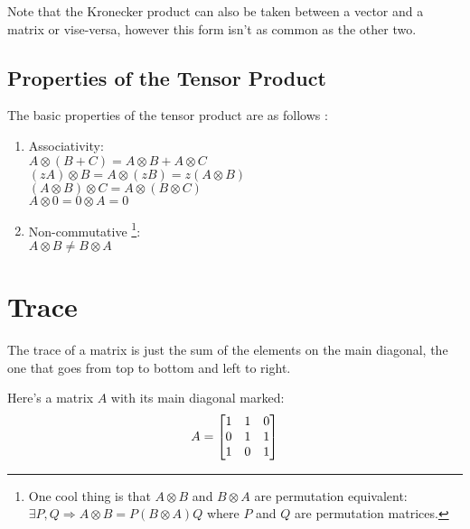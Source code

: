 Note that the Kronecker product can also be taken between a vector and a matrix or vise-versa, however this form isn't as common as the other two.


\subsection{Properties of the Tensor Product}
The basic properties of the tensor product are as follows \cite{QCandQI:tensor_product, wiki:tensor_product}:
\begin{enumerate}
	\item Associativity: \\ $A \otimes (B + C) = A \otimes B + A \otimes C$ \\
	$ (zA) \otimes B = A \otimes (zB) = z(A \otimes B)$\\
	$ (A \otimes B) \otimes C = A \otimes (B\otimes C)$ \\
	$A \otimes 0 = 0 \otimes A = 0 $
	\item Non-commutative \footnote{One cool thing is that $A \otimes B$ and $B \otimes A$ are permutation equivalent: \\ $\exists P, Q \Rightarrow A \otimes B = P (  B \otimes A )Q$ where $P$ and $Q$ are permutation matrices.  }: \\
	$A \otimes B \neq B \otimes A $
\end{enumerate}





\section{Trace}
The trace of a matrix is just the sum of the elements on the main diagonal, the one that goes from top to bottom and left to right.

Here's a matrix $A$ with its main diagonal marked:
$$A = 
	\begin{bmatrix}
		\tikzmark{top}{1} & \tikzmark{top2}{1} & 0 \\
		0 & 1 & \tikzmark{bottom2}{1} \\
		\tikzmark{end}{1} & 0 & \tikzmark{bottom}{1}\\
	\end{bmatrix}
$$

